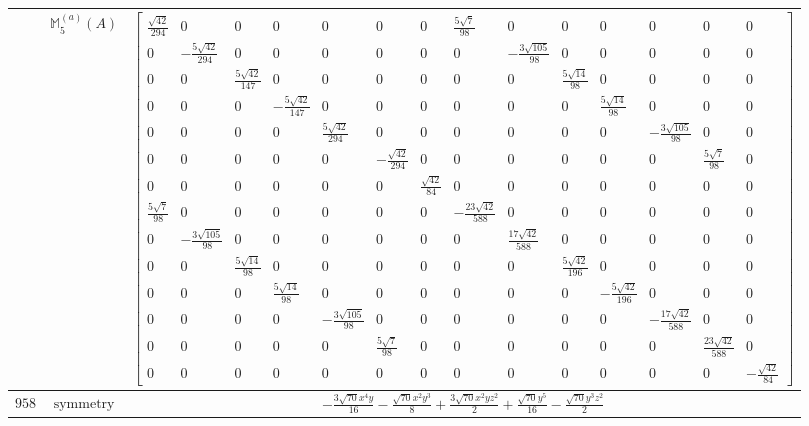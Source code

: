 \documentclass[fleqn,8pt,landscape]{jsarticle}
\begin{document}
\begin{longtable}{ccc}
$  $ & $ \mathbb{M}_{5}^{(a)}(A) $ & $ \begin{bmatrix} \frac{\sqrt{42}}{294} & 0 & 0 & 0 & 0 & 0 & 0 & \frac{5 \sqrt{7}}{98} & 0 & 0 & 0 & 0 & 0 & 0 \\ 0 & - \frac{5 \sqrt{42}}{294} & 0 & 0 & 0 & 0 & 0 & 0 & - \frac{3 \sqrt{105}}{98} & 0 & 0 & 0 & 0 & 0 \\ 0 & 0 & \frac{5 \sqrt{42}}{147} & 0 & 0 & 0 & 0 & 0 & 0 & \frac{5 \sqrt{14}}{98} & 0 & 0 & 0 & 0 \\ 0 & 0 & 0 & - \frac{5 \sqrt{42}}{147} & 0 & 0 & 0 & 0 & 0 & 0 & \frac{5 \sqrt{14}}{98} & 0 & 0 & 0 \\ 0 & 0 & 0 & 0 & \frac{5 \sqrt{42}}{294} & 0 & 0 & 0 & 0 & 0 & 0 & - \frac{3 \sqrt{105}}{98} & 0 & 0 \\ 0 & 0 & 0 & 0 & 0 & - \frac{\sqrt{42}}{294} & 0 & 0 & 0 & 0 & 0 & 0 & \frac{5 \sqrt{7}}{98} & 0 \\ 0 & 0 & 0 & 0 & 0 & 0 & \frac{\sqrt{42}}{84} & 0 & 0 & 0 & 0 & 0 & 0 & 0 \\ \frac{5 \sqrt{7}}{98} & 0 & 0 & 0 & 0 & 0 & 0 & - \frac{23 \sqrt{42}}{588} & 0 & 0 & 0 & 0 & 0 & 0 \\ 0 & - \frac{3 \sqrt{105}}{98} & 0 & 0 & 0 & 0 & 0 & 0 & \frac{17 \sqrt{42}}{588} & 0 & 0 & 0 & 0 & 0 \\ 0 & 0 & \frac{5 \sqrt{14}}{98} & 0 & 0 & 0 & 0 & 0 & 0 & \frac{5 \sqrt{42}}{196} & 0 & 0 & 0 & 0 \\ 0 & 0 & 0 & \frac{5 \sqrt{14}}{98} & 0 & 0 & 0 & 0 & 0 & 0 & - \frac{5 \sqrt{42}}{196} & 0 & 0 & 0 \\ 0 & 0 & 0 & 0 & - \frac{3 \sqrt{105}}{98} & 0 & 0 & 0 & 0 & 0 & 0 & - \frac{17 \sqrt{42}}{588} & 0 & 0 \\ 0 & 0 & 0 & 0 & 0 & \frac{5 \sqrt{7}}{98} & 0 & 0 & 0 & 0 & 0 & 0 & \frac{23 \sqrt{42}}{588} & 0 \\ 0 & 0 & 0 & 0 & 0 & 0 & 0 & 0 & 0 & 0 & 0 & 0 & 0 & - \frac{\sqrt{42}}{84} \end{bmatrix} $ \\ \hline
$ 958 $ & $ \text{symmetry} $ & $ - \frac{3 \sqrt{70} x^{4} y}{16} - \frac{\sqrt{70} x^{2} y^{3}}{8} + \frac{3 \sqrt{70} x^{2} y z^{2}}{2} + \frac{\sqrt{70} y^{5}}{16} - \frac{\sqrt{70} y^{3} z^{2}}{2} $ \\

\end{longtable}
\end{document}
